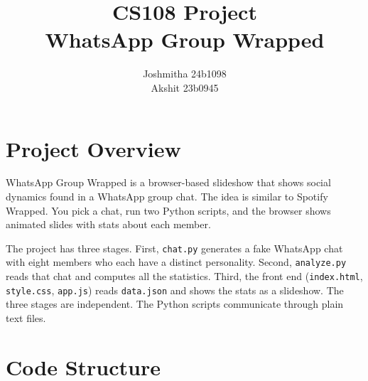 \documentclass{article}
\title{\textbf{CS108 Project} \\ \large WhatsApp Group Wrapped}
\author{Joshmitha \quad 24b1098 \\ Akshit \quad 23b0945}
\date{}
\begin{document}
\maketitle

\section{Project Overview}

WhatsApp Group Wrapped is a browser-based slideshow that shows social dynamics found in a WhatsApp group chat. The idea is similar to Spotify Wrapped. You pick a chat, run two Python scripts, and the browser shows animated slides with stats about each member.

The project has three stages. First, \texttt{chat.py} generates a fake WhatsApp chat with eight members who each have a distinct personality. Second, \texttt{analyze.py} reads that chat and computes all the statistics. Third, the front end (\texttt{index.html}, \texttt{style.css}, \texttt{app.js}) reads \texttt{data.json} and shows the stats as a slideshow. The three stages are independent. The Python scripts communicate through plain text files.

\section{Code Structure}
\end{document}
